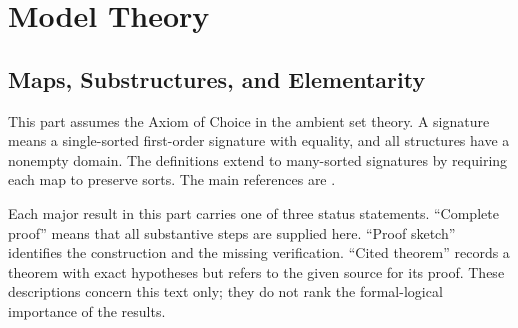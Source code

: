 \part{Model Theory}
\label{part:model-theory}

\chapter{Maps, Substructures, and Elementarity}
\label{ch:maps-elementarity}

This part assumes the Axiom of Choice in the ambient set theory.  A signature means a
single-sorted first-order signature with equality, and all structures have a
nonempty domain.  The definitions extend to many-sorted signatures by requiring
each map to preserve sorts.  The main references are
\cite{ChangKeisler1990,Hodges1993,Marker2002}.

\begin{convention}
Each major result in this part carries one of three status statements.
``Complete proof'' means that all substantive steps are supplied here.
``Proof sketch'' identifies the construction and the missing verification.
``Cited theorem'' records a theorem with exact hypotheses but refers to the
given source for its proof.  These descriptions concern this text only; they do
not rank the formal-logical importance of the results.
\end{convention}

